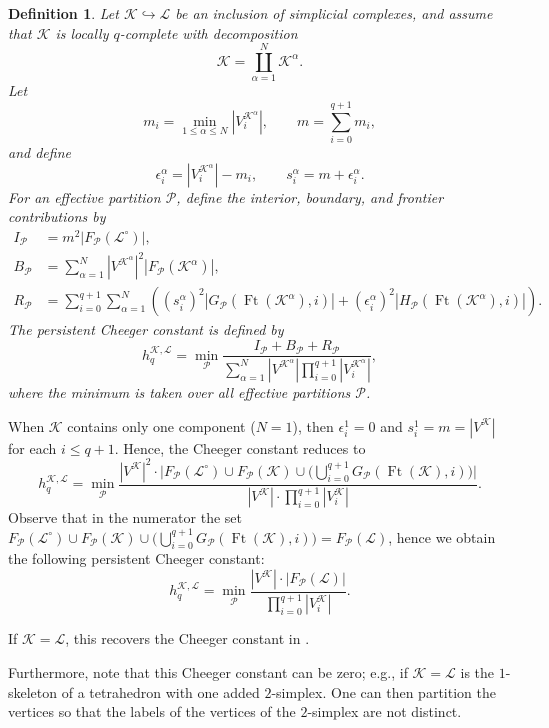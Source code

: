 \documentclass{article}
\newtheorem{definition}{Definition}[section]
\newcommand{\KK}{\mathcal{K}}
\newcommand{\LL}{\mathcal{L}}
\newcommand{\Ft}{\operatorname{Ft}}
\begin{document}
\begin{definition}\label{def:nt_cheeger}
Let $\KK\hookrightarrow \LL$ be an inclusion of simplicial complexes, and assume that $\KK$ is locally $q$-complete with decomposition
\[
\KK = \coprod_{\alpha=1}^N \KK^\alpha.
\]
Let
\[
m_i = \min_{1 \leq \alpha \leq N} |V_i^{\KK^\alpha}|,
\qquad
m = \sum_{i=0}^{q+1} m_i,
\]
and define
\[
\epsilon_i^\alpha = |V_i^{\KK^\alpha}| - m_i,
\qquad
s_i^\alpha = m + \epsilon_i^\alpha .
\]
For an effective partition $\mathcal{P}$, define the \emph{interior, boundary, and frontier contributions} by
\begin{align*}
I_{\mathcal{P}}
&=
m^2 |F_{\mathcal{P}}(\LL^\circ)|, \\
B_{\mathcal{P}}
&=
\sum_{\alpha=1}^N
|V^{\KK^\alpha}|^2
|F_{\mathcal{P}}(\KK^\alpha)|, \\
R_{\mathcal{P}}
&=
\sum_{i=0}^{q+1}
\sum_{\alpha=1}^N
\left(
(s_i^\alpha)^2
|G_{\mathcal{P}}(\Ft(\KK^\alpha),i)|
+
(\epsilon_i^\alpha)^2
|H_{\mathcal{P}}(\Ft(\KK^\alpha),i)|
\right).
\end{align*}
The \emph{persistent Cheeger constant} is defined by
\[
h_q^{\KK,\LL}
=
\min_{\mathcal{P}}
\frac{
I_{\mathcal{P}} + B_{\mathcal{P}} + R_{\mathcal{P}}
}{
\displaystyle
\sum_{\alpha=1}^N
|V^{\KK^\alpha}|
\prod_{i=0}^{q+1}
|V_i^{\KK^\alpha}|
},
\]
where the minimum is taken over all effective partitions $\mathcal{P}$.
\end{definition}

When $\KK$ contains only one component ($N=1$), then $\epsilon_i^1=0$ and $s_i^1=m=|V^\KK|$ for each $i\leq q+1$. Hence, the Cheeger constant reduces to
\[
h_{q}^{\KK, \LL}
=
\min_{\mathcal{P}}
\frac{
|V^\KK|^2\cdot \big|F_{\mathcal{P}}(\LL^\circ)\cup F_{\mathcal{P}}(\KK) \cup \big(\bigcup_{i=0}^{q+1}G_{\mathcal{P}}(\Ft(\KK), i)\big)\big|
}{|V^\KK|\cdot \prod_{i=0}^{q+1}|V^\KK_i|}.
\]
Observe that in the numerator the set $F_{\mathcal{P}}(\LL^\circ)\cup F_{\mathcal{P}}(\KK) \cup \big(\bigcup_{i=0}^{q+1}G_{\mathcal{P}}(\Ft(\KK), i)\big)=F_{\mathcal{P}}(\LL)$,
hence we obtain the following persistent Cheeger constant:
\begin{equation}\label{eq:nt_cheeger_inq_graph}
h_{q}^{\KK, \LL}=
\min_{\mathcal{P}}
\frac{|V^\KK|\cdot|F_{\mathcal{P}}(\LL)|}{\prod_{i=0}^{q+1}|V^\KK_i|}.
\end{equation}

If $\KK=\LL$, this recovers the Cheeger constant in \cite[Theorem 1.2]{MR3516884}.

Furthermore, note that this Cheeger constant can be zero; e.g., if $\KK=\LL$ is the $1$-skeleton of a tetrahedron with one added $2$-simplex. One can then partition the vertices so that the labels of the vertices of the $2$-simplex are not distinct.
 
\end{document}
